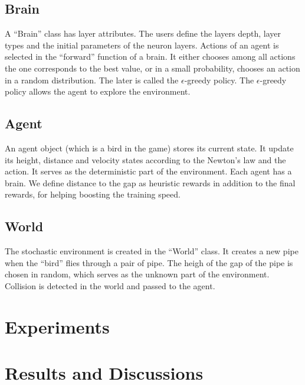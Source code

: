 \documentclass[conference,compsoc]{IEEEtran}
\begin{document}
\subsection{Brain}
A ``Brain'' class has layer attributes. The users define the layers depth, layer types and the initial parameters of the neuron layers. Actions of an agent is selected in the ``forward'' function of a brain. It either chooses among all actions the one corresponds to the best value, or in a small probability, chooses an action in a random distribution. The later is called the $\epsilon$-greedy policy. The $\epsilon$-greedy policy allows the agent to explore the environment. 

\subsection{Agent} 
An agent object (which is a bird in the game) stores its current state. It update its height, distance and velocity states according to the Newton's law and the action. It serves as the deterministic part of the environment. Each agent has a brain. We define distance to the gap as heuristic rewards in addition to the final rewards, for helping boosting the training speed. 

\subsection{World}
The stochastic environment is created in the ``World'' class. It creates a new pipe when the ``bird'' flies through a pair of pipe. The heigh of the gap of the pipe is chosen in random, which serves as the unknown part of the environment. Collision is detected in the world and passed to the agent. 

\section{Experiments}


\section{Results and Discussions}


%
%
\end{document}
